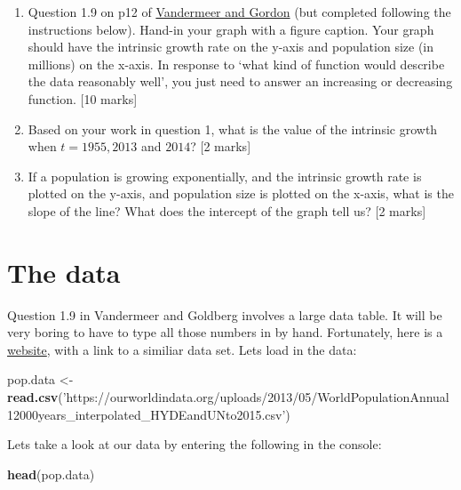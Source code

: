 \documentclass[]{book}
\newenvironment{Shaded}{\begin{snugshade}}{\end{snugshade}}
\newcommand{\KeywordTok}[1]{\textcolor[rgb]{0.13,0.29,0.53}{\textbf{{#1}}}}
\newcommand{\StringTok}[1]{\textcolor[rgb]{0.31,0.60,0.02}{{#1}}}
\newcommand{\NormalTok}[1]{{#1}}
\begin{document}
\begin{enumerate}
\def\labelenumi{\arabic{enumi}.}
\item
  Question 1.9 on p12 of
  \href{https://ebookcentral-proquest-com.qe2a-proxy.mun.ca/lib/mun/detail.action?docID=1205619}{Vandermeer
  and Gordon} (but completed following the instructions below). Hand-in
  your graph with a figure caption. Your graph should have the intrinsic
  growth rate on the y-axis and population size (in millions) on the
  x-axis. In response to `what kind of function would describe the data
  reasonably well', you just need to answer an increasing or decreasing
  function. {[}10 marks{]}
\item
  Based on your work in question 1, what is the value of the intrinsic
  growth when \(t = 1955, 2013\) and \(2014\)? {[}2 marks{]}
\item
  If a population is growing exponentially, and the intrinsic growth
  rate is plotted on the y-axis, and population size is plotted on the
  x-axis, what is the slope of the line? What does the intercept of the
  graph tell us? {[}2 marks{]}
\end{enumerate}

\section{The data}\label{the-data}

Question 1.9 in Vandermeer and Goldberg involves a large data table. It
will be very boring to have to type all those numbers in by hand.
Fortunately, here is a
\href{https://ourworldindata.org/world-population-growth}{website}, with
a link to a similiar data set. Lets load in the data:

\begin{Shaded}
\begin{Highlighting}[]
\NormalTok{pop.data <-}\StringTok{ }\KeywordTok{read.csv}\NormalTok{(}\StringTok{'https://ourworldindata.org/uploads/2013/05/WorldPopulationAnnual12000years_interpolated_HYDEandUNto2015.csv'}\NormalTok{)}
\end{Highlighting}
\end{Shaded}

Lets take a look at our data by entering the following in the console:

\begin{Shaded}
\begin{Highlighting}[]
\KeywordTok{head}\NormalTok{(pop.data)}
\end{Highlighting}
\end{Shaded}
\end{document}
